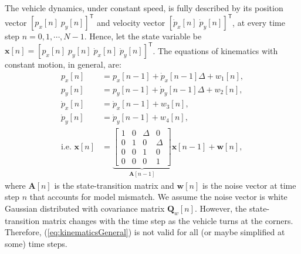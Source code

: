 \documentclass[11pt]{article}
\newcommand{\bx}{\mathbf{x}}
\newcommand{\bw}{\mathbf{w}}
\newcommand{\bA}{\mathbf{A}}
\newcommand{\bQ}{\mathbf{Q}}
\newcommand{\TT}{\mathsf{T}}
\begin{document}
The vehicle dynamics, under constant speed, is fully described by its position vector $[p_{x}[n] \; p_{y}[n]]^{\TT}$ and velocity vector $[\dot{p}_{x}[n] \; \dot{p}_{y}[n]]^{\TT}$, at every time step $n=0,1,\cdots,N-1$. Hence, let the state variable be $\bx[n] = [p_{x}[n] \; p_{y}[n] \; \dot{p}_{x}[n] \; \dot{p}_{y}[n]]^{\TT}$. The equations of kinematics with constant motion, in general, are:
\begin{equation}
\begin{split}
	p_{x}[n] &= p_{x}[n-1] + \dot{p}_{x}[n-1] \Delta + w_{1}[n], \\
	p_{y}[n] &= p_{y}[n-1] + \dot{p}_{y}[n-1] \Delta + w_{2}[n], \\
	\dot{p}_{x}[n] &= \dot{p}_{x}[n-1] + w_{3}[n], \\
	\dot{p}_{y}[n] &= \dot{p}_{y}[n-1] + w_{4}[n], \\
	\text{i.e. }
	\bx[n] &= \underbrace{\begin{bmatrix}
		1 & 0 & \Delta & 0 \\
		0 & 1 & 0 & \Delta \\
		0 & 0 & 1 & 0 \\
		0 & 0 & 0 & 1
	\end{bmatrix}}_{\bA[n-1]} \bx[n-1] + \bw[n],
\end{split}
\label{eq:kinematicsGeneral}
\end{equation}
where $\bA[n]$ is the state-transition matrix and $\bw[n]$ is the noise vector at time step $n$ that accounts for model mismatch. We assume the noise vector is white Gaussian distributed with covariance matrix $\bQ_{w}[n]$. However, the state-transition matrix changes with the time step as the vehicle turns at the corners. Therefore, (\ref{eq:kinematicsGeneral}) is not valid for all (or maybe simplified at some) time steps.
\end{document}
